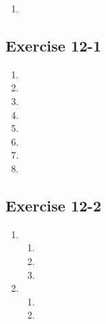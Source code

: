 \begin{enumerate}[itemsep=20pt, label=\textbf{\arabic*}.]
\begin{enumerate}[noitemsep, label=\textbf{(\alph*)} ]
\end{enumerate}


\item %

\end{enumerate}

\subsection{Exercise 12-1} %

\begin{enumerate}[noitemsep, label=\textbf{\arabic*}. ] 
 \item
\item
\item
\item 
\item
\item
\item
\item 
\end{enumerate}
\subsection{Exercise 12-2} %
\begin{enumerate}[noitemsep, label=\textbf{\arabic*}. ] 
\item %
 \begin{enumerate}[noitemsep, label=\textbf{(\alph*)} ]
  \item 
\item 
\item
 \end{enumerate}


\item %
 \begin{enumerate}[noitemsep, label=\textbf{(\alph*)} ]
\item %
\item %
\end{enumerate}


 \end{enumerate}       
